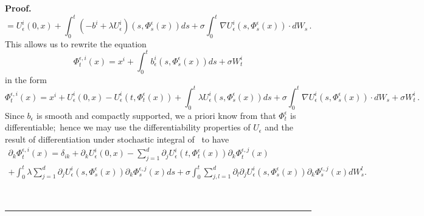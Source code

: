 \documentclass[a4paper,10pt]{article}
\newenvironment{proof}[1][Proof]{\noindent\textbf{#1.} }{\ \rule{0.5em}{0.5em}}
\newcommand{\eps}{\epsilon}
\begin{document}
\begin{proof}
\[=U_{\epsilon}^{i}(  0,x)  +\int_{0}^{t}(  -b^{i}+\lambda
U_{\epsilon}^{i})  (  s,\Phi^{\eps}_s(x)
)  ds+\sigma\int_{0}^{t}\nabla U_{\epsilon}^{i}(  s,\Phi
^{\eps}_s(x)  )  \cdot dW_{s} \, .
\]
This allows us to rewrite the equation
\[
\Phi_{t}^{\epsilon,i}(x)  =x^{i}+\int_{0}^{t}b_{\epsilon} 
^{i}(s,\Phi^{\eps}_s(x))  ds+\sigma
W_{t}^{i} 
\]
in the form
\begin{equation*}
\Phi^{\epsilon,i}_{t}(x) =x^{i}+U_{\epsilon}^{i}(
0,x)  -U_{\epsilon}^{i}(  t,\Phi^{\eps}_t(x)
)  
+ \int_{0}^{t}\lambda U_{\epsilon}^{i}(s,\Phi^{\eps}_s(x))  ds
+ \sigma\int_{0}^{t}\nabla U_{\epsilon}^{i}(  s,\Phi^{\eps}_s(x)  )  \cdot dW_{s}+\sigma W_{t}^{i} \, .
\end{equation*}
Since $b_{\epsilon}$ is smooth and compactly supported, we a priori know from
\cite{KUNITA84} that $\Phi^{\eps}_t$ is differentiable;\ hence we may use the
differentiability properties of $U_{\epsilon}$ and the result of
differentiation under stochastic integral of~\cite{KUNITA84} to have
\begin{multline}
\label{formula_Dvarphi}
\partial_{k}\Phi^{\epsilon,i}_{t}(x) =\delta
_{ik}+\partial_{k}U_{\epsilon}^{i}(0,x)  -\sum_{j=1}^{d}
\partial_{j}U_{\epsilon}^{i}(t,\Phi^{\eps}_t(x)) 
\partial_{k}\Phi^{\epsilon,j}_{t}(x)  \\
+\int_{0}^{t}\lambda\sum_{j=1}^{d}\partial_{j}U_{\epsilon}^{i}(
s,\Phi^{\eps}_s(x)) \partial_{k}\Phi
^{\epsilon,j}_{s}(x) ds
+\sigma\int_{0}^{t}\sum_{j,l=1}^{d}\partial_{l}\partial_{j}U_{\epsilon} 
^{i}(s,\Phi^{\epsilon}_s(x))  \partial
_{k}\Phi^{\epsilon,j}_{s}(x)  dW_{s}^{l}.
\end{multline}


\end{proof}
\end{document}
